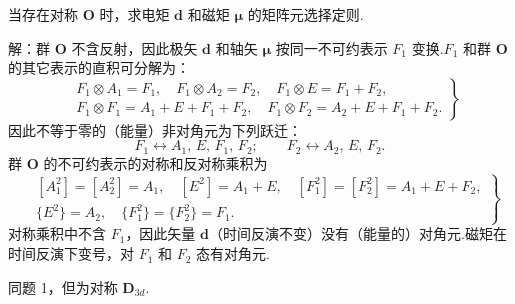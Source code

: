 \begin{xiti}

\setcounter{equation}{0}%

\quad 当存在对称 $\boldsymbol{O}$ 时，求电矩 $\boldsymbol{d}$ 和磁矩 $\boldsymbol{\mu}$ 的矩阵元选择定则.

解：群 $\boldsymbol{O}$ 不含反射，因此极矢 $\boldsymbol{d}$ 和轴矢 $\boldsymbol{\mu}$ 按同一不可约表示 $F_1$ 变换.$F_1$ 和群 $\boldsymbol{O}$ 的其它表示的直积可分解为：
\begin{equation}
\left.\begin{aligned}
  &F_1\otimes A_1=F_1,\quad F_1\otimes A_2=F_2,\quad
   F_1\otimes E=F_1+F_2,\\
  &F_1\otimes F_1=A_1+E+F_1+F_2,\quad
   F_1\otimes F_2=A_2+E+F_1+F_2.
\end{aligned}\right\}
\end{equation}
因此不等于零的（能量）非对角元为下列跃迁：
\begin{equation*}
  F_1\leftrightarrow A_1,\,E,\,F_1,\,F_2;\qquad
  F_2\leftrightarrow A_2,\,E,\,F_2.
\end{equation*}
群 $\boldsymbol{O}$ 的不可约表示的对称和反对称乘积为
\begin{equation}
\left.\begin{aligned}
  &[A_1^2]=[A_2^2]=A_1,\quad [E^2]=A_1+E,\quad
   [F_1^2]=[F_2^2]=A_1+E+F_2,\\
  &\{E^2\}=A_2,\quad \{F_1^2\}=\{F_2^2\}=F_1.
\end{aligned}\right\}
\end{equation}
对称乘积中不含 $F_1$，因此矢量 $\boldsymbol{d}$（时间反演不变）没有（能量的）对角元.磁矩在时间反演下变号，对 $F_1$ 和 $F_2$ 态有对角元.

\quad 同题 1，但为对称 $\boldsymbol{D}_{3d}$.


\end{xiti}
